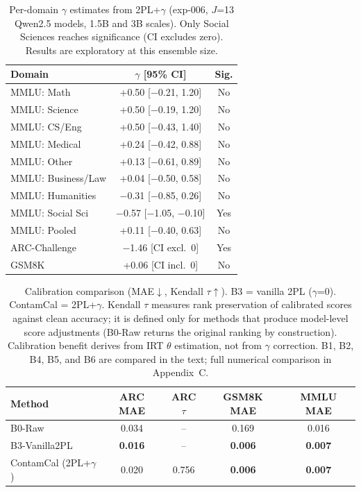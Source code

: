 \begin{table}[t]
\centering
\caption{Per-domain $\gamma$ estimates from 2PL+$\gamma$ (exp-006, $J$=13 Qwen2.5 models, 1.5B and 3B scales). Only Social Sciences reaches significance (CI excludes zero). Results are exploratory at this ensemble size.}
\label{tab:domain_gamma}
\small
\begin{tabular}{lcc}
\toprule
Domain & $\gamma$ [95\% CI] & Sig. \\
\midrule
MMLU: Math & +0.50 [$-$0.21, 1.20] & No \\
MMLU: Science & +0.50 [$-$0.19, 1.20] & No \\
MMLU: CS/Eng & +0.50 [$-$0.43, 1.40] & No \\
MMLU: Medical & +0.24 [$-$0.42, 0.88] & No \\
MMLU: Other & +0.13 [$-$0.61, 0.89] & No \\
MMLU: Business/Law & +0.04 [$-$0.50, 0.58] & No \\
MMLU: Humanities & $-$0.31 [$-$0.85, 0.26] & No \\
MMLU: Social Sci & $-$0.57 [$-$1.05, $-$0.10] & Yes \\
\midrule
MMLU: Pooled & +0.11 [$-$0.40, 0.63] & No \\
ARC-Challenge & $-$1.46 [CI excl.\ 0] & Yes \\
GSM8K & +0.06 [CI incl.\ 0] & No \\
\bottomrule
\end{tabular}
\end{table}

\begin{table}[t]
\centering
\caption{Calibration comparison (MAE$\downarrow$, Kendall $\tau$$\uparrow$). B3 = vanilla 2PL ($\gamma$=0). ContamCal = 2PL+$\gamma$. Kendall $\tau$ measures rank preservation of calibrated scores against clean accuracy; it is defined only for methods that produce model-level score adjustments (B0-Raw returns the original ranking by construction). Calibration benefit derives from IRT $\theta$ estimation, not from $\gamma$ correction. B1, B2, B4, B5, and B6 are compared in the text; full numerical comparison in Appendix~C.}
\label{tab:baselines}
\small
\begin{tabular}{lcccc}
\toprule
Method & ARC MAE & ARC $\tau$ & GSM8K MAE & MMLU MAE \\
\midrule
B0-Raw & 0.034 & -- & 0.169 & 0.016 \\
B3-Vanilla2PL & \textbf{0.016} & -- & \textbf{0.006} & \textbf{0.007} \\
ContamCal (2PL+$\gamma$) & 0.020 & 0.756 & \textbf{0.006} & \textbf{0.007} \\
\bottomrule
\end{tabular}
\end{table}